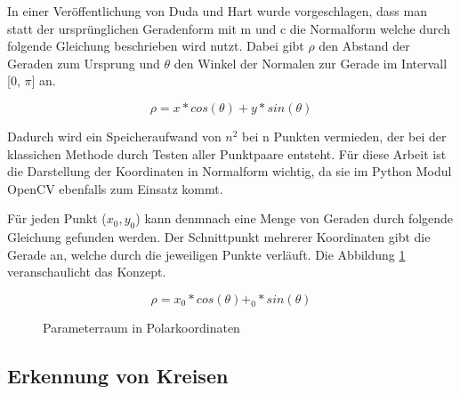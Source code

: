 In einer Veröffentlichung von Duda und Hart \cite{duda_use_1972} wurde vorgeschlagen, dass man statt der ursprünglichen Geradenform mit m und c die Normalform welche durch folgende Gleichung beschrieben wird nutzt. Dabei gibt $\rho$ den Abstand der Geraden zum Ursprung und $\theta$ den Winkel der Normalen zur Gerade im Intervall [0, $\pi$] an.

\[
\rho = x * cos(\theta) + y * sin(\theta)
\]

Dadurch wird ein Speicheraufwand von $n^2$ bei n Punkten vermieden, der bei der klassichen Methode durch Testen aller Punktpaare entsteht. Für diese Arbeit ist die Darstellung der Koordinaten in Normalform wichtig, da sie im Python Modul OpenCV ebenfalls zum Einsatz kommt. \cite{noauthor_opencv_nodate}

Für jeden Punkt ($x_0, y_0$) kann denmnach eine Menge von Geraden durch folgende Gleichung gefunden werden. Der Schnittpunkt mehrerer Koordinaten gibt die Gerade an, welche durch die jeweiligen Punkte verläuft. Die Abbildung \ref{Polarkoordinaten} veranschaulicht das Konzept.

\[
\rho = x_0 * cos(\theta) + _0 * sin(\theta)
\]

\begin{figure}[H]
\centering
{}
\caption{Parameterraum in Polarkoordinaten}
\label{Polarkoordinaten}
\end{figure}

\subsection{Erkennung von Kreisen}


